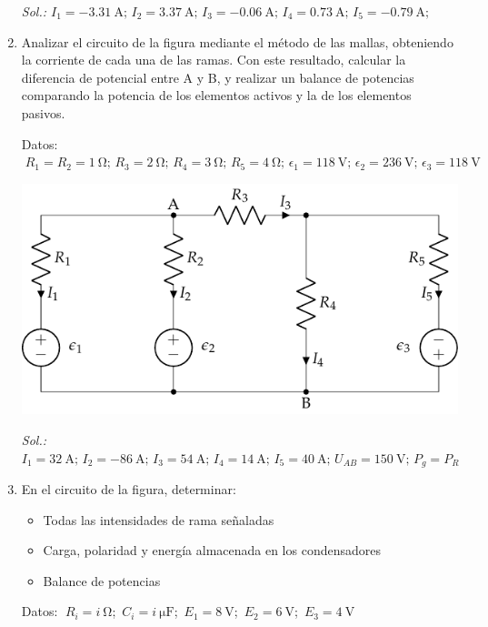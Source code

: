 \begin{enumerate}
  \emph{Sol.:\;
    $I_1=\qty{-3.31}{\ampere};\, I_2=\qty{3.37}{\ampere};\, I_3=\qty{-0.06}{\ampere};\, 
    I_4=\qty{0.73}{\ampere};\,  I_5=\qty{-0.79}{\ampere};\, $}
 	

\item Analizar el circuito de la figura mediante el método de las mallas, obteniendo la corriente de cada una de las ramas. Con este resultado, calcular la diferencia de potencial entre A y B, y realizar un balance de potencias comparando la potencia de los elementos activos y la de los elementos pasivos. 

Datos: $\; R_1 = R_2 = \qty{1}{\ohm};\, R_3 = \qty{2}{\ohm};\, R_4 = \qty{3}{\ohm};\, R_5=\qty{4}{\ohm};\, \epsilon_1=\qty{118}{\volt};\, \epsilon_2 = \qty{236}{\volt};\, \epsilon_3 = \qty{118}{\volt}$\\

  \begin{center}
    \includegraphics{../figs/mallas2.pdf}
  \end{center}

 \emph{Sol.:\;
    $I_1 = \qty{32}{\ampere};\, I_2 = \qty{-86}{\ampere};\, I_3 =\qty{54}{\ampere};\, I_4 = \qty{14}{\ampere};\, I_5 = \qty{40}{\ampere};\,
    U_{AB}=\qty{150}{\volt};\, P_g = P_R$}
 	

\item En el circuito de la figura, determinar:
  \begin{itemize}
  \item Todas las intensidades de rama señaladas
  \item Carga, polaridad y energía almacenada en los condensadores
  \item Balance de potencias
  \end{itemize}
    Datos: $\; R_i = \qty[parse-numbers=false]{i}{\ohm}$;\, $C_i = \qty[parse-numbers=false]{i}{\micro\farad}$;\, $E_1 = \qty{8}{\volt}$;\, $E_2 = \qty{6}{\volt}$;\, $E_3 = \qty{4}{\volt}$


\end{enumerate}
